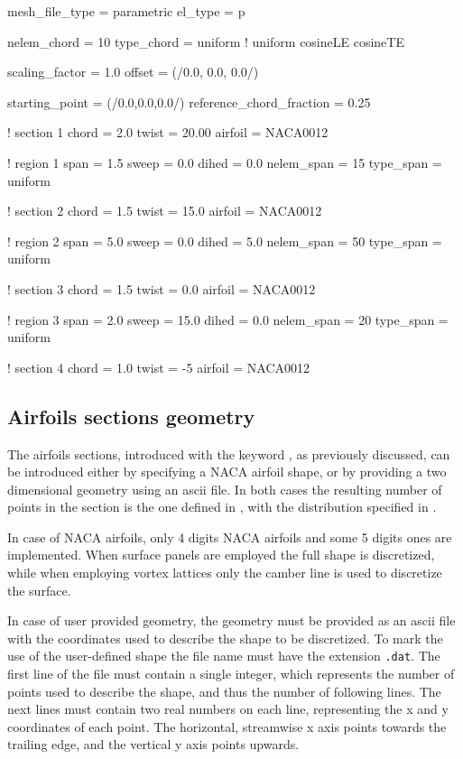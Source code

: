 \begin{inputfile}[frame=single, caption={Parametric geometry for figure \ref{fig:parametric_sections}}, label={file:parametric_example_file.in}]
mesh_file_type = parametric
el_type = p

nelem_chord = 10
type_chord = uniform   ! uniform  cosineLE  cosineTE

scaling_factor = 1.0
offset = (/0.0, 0.0, 0.0/)

starting_point = (/0.0,0.0,0.0/)
reference_chord_fraction = 0.25

! section 1
chord = 2.0
twist = 20.00
airfoil = NACA0012

! region  1
span = 1.5
sweep = 0.0
dihed = 0.0
nelem_span = 15
type_span = uniform

! section 2
chord = 1.5
twist = 15.0
airfoil = NACA0012

! region  2
span = 5.0
sweep = 0.0
dihed = 5.0
nelem_span = 50
type_span = uniform

! section 3
chord = 1.5
twist = 0.0
airfoil = NACA0012

! region  3
span = 2.0
sweep = 15.0
dihed = 0.0
nelem_span = 20
type_span = uniform

! section 4
chord = 1.0
twist = -5
airfoil = NACA0012
\end{inputfile}


\subsection{Airfoils sections geometry}
The airfoils sections, introduced with the keyword , as previously discussed, 
can be introduced either by specifying a NACA airfoil shape, or by providing a two dimensional 
geometry using an ascii file. In both cases the resulting number of points in the section is the 
one defined in , with the distribution specified in . 

In case of NACA airfoils, only 4 digits NACA airfoils and some 5 digits ones are implemented. 
When surface panels are employed the full shape is discretized, while when employing vortex 
lattices only the camber line is used to discretize the surface. 

In case of user provided geometry, the geometry must be provided as an ascii file with the 
coordinates used to describe the shape to be discretized. To mark the use of the user-defined 
shape the file name must have the extension \texttt{.dat}. 
The first line of the file must contain a single integer, which represents the number of points 
used to describe the shape, and thus the number of following lines. 
The next lines must contain two real numbers on each line, representing the x and y coordinates 
of each point. The horizontal, streamwise x axis points  towards the trailing edge, 
and the vertical y axis points upwards. 

